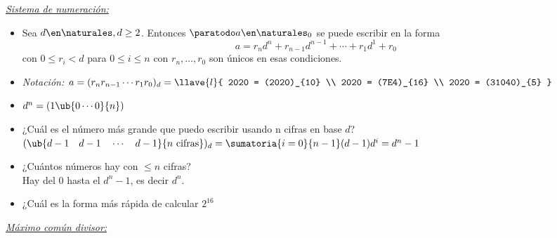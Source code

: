 \textit{\underline{Sistema de numeración: }}
\begin{itemize}
  \item Sea $d \en \naturales, d \geq 2$. Entonces $\paratodo a \en \naturales_0$ se puede
        escribir en la forma
        $$
          a = r_n d^n + r_{n-1} d^{n-1} + \cdots + r_1 d^1 + r_0
        $$
        con $0 \leq r_i < d$ para $0 \leq i \leq n$ con $r_n,\dots, r_0$ son únicos
        en esas condiciones.

  \item \textit{Notación:} $a = (r_n r_{n-1}\cdots r_1 r_0)_d =
          \llave{l}{
            2020 = (2020)_{10} \\
            2020 = (7E4)_{16} \\
            2020 = (31040)_{5}
          }$
  \item $d^n = (1 \ub{0\cdots 0}{n})$

  \item ¿Cuál es el número más grande que puedo escribir usando n cifras en base $d$?\\
        $(\ub{d-1\quad d-1\quad \cdots\quad d-1}{n \text{ cifras}})_d =  \sumatoria{i=0}{n-1}(d-1)d^i = d^n -1$

  \item ¿Cuántos números hay con $\leq n$ cifras?\\
        Hay del $0$ hasta el $d^n -1$, es decir $d^n$.

  \item ¿Cuál es la forma más rápida de calcular $2^{16}$

\end{itemize}
\textit{\underline{Máximo común divisor: }}
\def\mcd{(a:b)}
\def\D{\mathcal D}
\def\cz{s\cdot a + t \cdot b}
